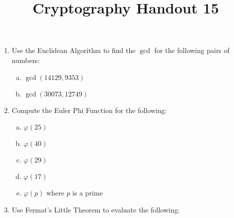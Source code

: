 \documentclass[12pt]{amsart}
\makeatletter
\def\subtitle#1{\gdef\@subtitle{#1}}
\def\@subtitle{}
\theoremstyle{plain}
\theoremstyle{definition}
\theoremstyle{remark}
\makeatother
\begin{document}
\onehalfspacing

\title[]{Cryptography Handout 15}
\subtitle{Number Theory Practice}
\maketitle

\begin{enumerate}[1.]
	\item Use the Euclidean Algorithm to find the $\gcd$ for the following pairs of numbers:
	\begin{enumerate}[a.]
		\item $\gcd(14129,9353)$
			\begin{framed}
			\vspace{1in}
			\end{framed}
		\item $\gcd(30073, 12749)$
			\begin{framed}
			\vspace{1in}
			\end{framed}
	\end{enumerate}
	\item Compute the Euler Phi Function for the following:
	\begin{enumerate}[a.]	
		\item $\varphi(25)$
			\begin{framed}
			\vspace{.5in}
			\end{framed}
		\item $\varphi(40)$
			\begin{framed}
			\vspace{.5in}
			\end{framed}	
		\item $\varphi(29)$
			\begin{framed}
			\vspace{.5in}
			\end{framed}
		\newpage \item $\varphi(17)$
			\begin{framed}
			\vspace{.5in}
			\end{framed}
		\item $\varphi(p)$ where $p$ is a prime
			\begin{framed}
			\vspace{.5in}
			\end{framed}
	\end{enumerate}
	\item Use Fermat's Little Theorem to evaluate the following:

\end{enumerate}
\end{document}
